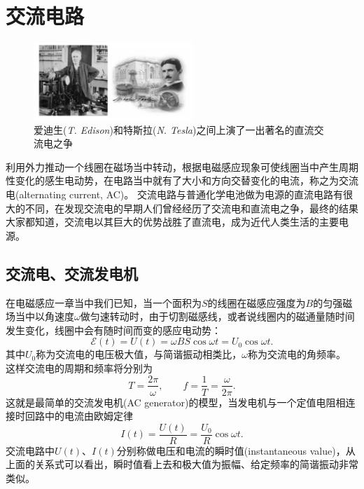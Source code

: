 
\chapter{交流电路}
\begin{figure}
\includegraphics[width=6cm]{images/mag-20.pdf} 
\caption{爱迪生(\textit{T. Edison})和特斯拉(\textit{N. Tesla})之间上演了一出著名的直流交流电之争}
\end{figure}
利用外力推动一个线圈在磁场当中转动，根据电磁感应现象可使线圈当中产生周期性变化的感生电动势，在电路当中就有了大小和方向交替变化的电流，称之为{\heiti 交流电}(alternating current, AC)。
交流电路与普通化学电池做为电源的直流电路有很大的不同，在发现交流电的早期人们曾经经历了交流电和直流电之争，最终的结果大家都知道，交流电以其巨大的优势战胜了直流电，成为近代人类生活的主要电源。
\section{交流电、交流发电机}
在电磁感应一章当中我们已知，当一个面积为$S$的线圈在磁感应强度为$B$的匀强磁场当中以角速度$\omega$做匀速转动时，由于切割磁感线，或者说线圈内的磁通量随时间发生变化，线圈中会有随时间而变的感应电动势：
\begin{equation}
\mathcal{E}(t) =U(t)= \omega BS\cos\omega t  = U_0\cos\omega t.
\end{equation}
其中$U_0$称为交流电的电压极大值，与简谐振动相类比，$\omega$称为交流电的角频率。
这样交流电的周期和频率将分别为
\begin{equation}
T = \frac{2\pi}{\omega},\qquad f = \frac{1}{T} = \frac{\omega}{2\pi}.
\end{equation}
这就是最简单的{\heiti 交流发电机}(AC generator)的模型，当发电机与一个定值电阻相连接时回路中的电流由欧姆定律
\begin{equation}
I(t) = \frac{U(t)}{R} = \frac{U_0}{R}\cos\omega t.
\end{equation}
交流电路中$U(t)$、$I(t)$分别称做电压和电流的{\heiti 瞬时值}(instantaneous value)，从上面的关系式可以看出，瞬时值看上去和极大值为振幅、给定频率的简谐振动非常类似。

